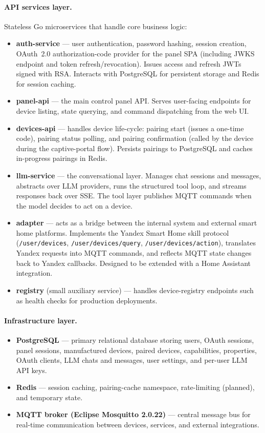 \documentclass[a4paper,12pt]{article}
\begin{document}
\paragraph{API services layer.} Stateless Go microservices that handle core business logic:

\begin{itemize}
  \item \textbf{auth-service} --- user authentication, password hashing, session creation, OAuth~2.0 authorization-code provider for the panel SPA (including JWKS endpoint and token refresh/revocation). Issues access and refresh JWTs signed with RSA. Interacts with PostgreSQL for persistent storage and Redis for session caching.
  \item \textbf{panel-api} --- the main control panel API. Serves user-facing endpoints for device listing, state querying, and command dispatching from the web UI.
  \item \textbf{devices-api} --- handles device life-cycle: pairing start (issues a one-time code), pairing status polling, and pairing confirmation (called by the device during the captive-portal flow). Persists pairings to PostgreSQL and caches in-progress pairings in Redis.
  \item \textbf{llm-service} --- the conversational layer. Manages chat sessions and messages, abstracts over LLM providers, runs the structured tool loop, and streams responses back over SSE. The tool layer publishes MQTT commands when the model decides to act on a device.
  \item \textbf{adapter} --- acts as a bridge between the internal system and external smart home platforms. Implements the Yandex Smart Home skill protocol (\verb|/user/devices|, \verb|/user/devices/query|, \verb|/user/devices/action|), translates Yandex requests into MQTT commands, and reflects MQTT state changes back to Yandex callbacks. Designed to be extended with a Home Assistant integration.
  \item \textbf{registry} (small auxiliary service) --- handles device-registry endpoints such as health checks for production deployments.
\end{itemize}

\paragraph{Infrastructure layer.}
\begin{itemize}
  \item \textbf{PostgreSQL} --- primary relational database storing users, OAuth sessions, panel sessions, manufactured devices, paired devices, capabilities, properties, OAuth clients, LLM chats and messages, user settings, and per-user LLM API keys.
  \item \textbf{Redis} --- session caching, pairing-cache namespace, rate-limiting (planned), and temporary state.
  \item \textbf{MQTT broker (Eclipse Mosquitto 2.0.22)} --- central message bus for real-time communication between devices, services, and external integrations.
\end{itemize}
\end{document}

